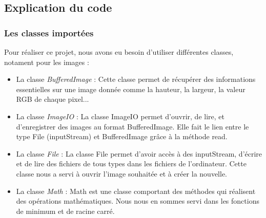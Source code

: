 \documentclass[12pt]{article}
\begin{document}
\subsection{Explication du code}
\subsubsection{Les classes importées}
Pour réaliser ce projet, nous avons eu besoin d'utiliser différentes classes, notament pour les images :
\begin{itemize}
    \item La classe \textit{BufferedImage} :
    Cette classe permet de récupérer des informations essentielles sur une image donnée comme la hauteur, la largeur, la valeur RGB de chaque pixel...

    \item La classe \textit{ImageIO} :
    La classe ImageIO permet d'ouvrir, de lire, et d'enregistrer des images au format BufferedImage. Elle fait le lien entre le type File (inputStream) et BufferedImage grâce à la méthode read.

    \item La classe \textit{File} :
    La classe File permet d'avoir accès à des inputStream, d'écrire et de lire des fichiers de tous types dans les fichiers de l'ordinateur. Cette classe nous a servi à ouvrir l'image souhaitée et à créer la nouvelle.

    \item La classe \textit{Math} :
    Math est une classe comportant des méthodes qui réalisent des opérations mathématiques. Nous nous en sommes servi dans les fonctions de minimum et de racine carré.
\end{itemize}
\newpage
\end{document}
